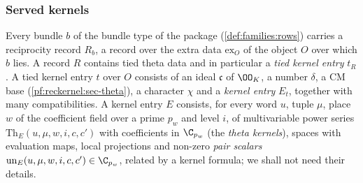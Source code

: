 \subsubsection{Served kernels}
Every bundle $b$ of the bundle type of the package (\cref{def:families:rows}) carries a reciprocity record $R_b$, a
record over the extra data $\mathrm{ex}_O$ of the object $O$ over which $b$ lies. A record $R$ contains tied theta data
and in particular a \emph{tied kernel entry} $t_R$. A tied kernel entry $t$ over $O$ consists of an ideal
$\mathfrak c$ of $\OO_K$, a number $\delta$, a CM base (\cref{pf:reckernel:sec-theta}), a character $\chi$ and a
\emph{kernel entry} $E_t$, together with many compatibilities. A kernel entry $E$ consists, for every word $u$, tuple
$\mu$, place $w$ of the coefficient field over a prime $p_w$ and level $i$, of multivariable power series
$\mathrm{Th}_E(u,\mu,w,i,c,c')$ with coefficients in $\C_{p_w}$ (the \emph{theta kernels}), spaces with evaluation
maps, local projections and non-zero \emph{pair scalars} $\mathrm{un}_E(u,\mu,w,i,c,c')\in\C_{p_w}$, related by a
kernel formula; we shall not need their details.

